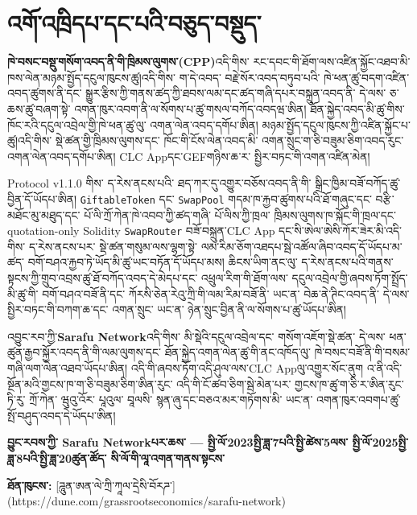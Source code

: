 \documentclass[11pt]{article}
\begin{document}
\section*{འགོ་འཁྲིདཔ་དང་པའི་བཅུད་བསྡུད་}

\textbf{ ཁེ་བསང་བསྡུ་གསོག་འབད་ནི་གི་ཁྲིམས་ལུགས་(CPP)}འདི་གིས་ རང་དབང་གི་ཐོག་ལས་འཛིན་སྐྱོང་འཐབ་མི་ ཁས་ལེན་མཉམ་སྤྱོད་དངུལ་ཁུངས་ཚུ།འདི་གིས་ ག་དེ་འབད་ བརྗེ་སོར་འབད་བཏུབ་པའི་ ཁེ་ཕན་ཚུ་བདག་འཛིན་འབད་ཚུགས་ནི་དང་ སྒྱུར་རྩིས་ཀྱི་གནས་ཚད་ཀྱི་ཐབས་ལམ་དང་ཚད་གཞི་དཔར་བསྐྲུན་འབད་ནི་ དེ་ལས་ ཅ་ཆས་ཚུ་བཞག་སྟེ་ འགན་ཁུར་འབག་ནི་ལ་སོགས་པ་ཚུ་གསལ་བཀོད་འབདཝ་ཨིན། ཐོན་སྐྱེད་འབད་མི་ཚུ་གིས་ ཁོང་རའི་དངུལ་འབྲེལ་གྱི་ཁེ་ཕན་ཚུ་ལུ་ འགན་ལེན་འབད་དགོཔ་ཨིན། མཉམ་སྤྱོད་དངུལ་ཁུངས་ཀྱི་འཛིན་སྐྱོང་པ་ཚུ།འདི་གིས་ སྡེ་ཚན་གྱི་ཁྲིམས་ལུགས་དང་ ཁོང་གི་ངོས་ལེན་འབད་མི་ འགན་སྲུང་ག་ཅི་བཟུམ་ཅིག་འབད་རུང་ འགན་ལེན་འབད་དགོཔ་ཨིན། CLC Appདང་GEFགཉིས་ཆ་ར་ སྤྱིར་བཏང་གི་འགན་འཛིན་མེན།

Protocol v1.1.0 གིས་ ད་རེས་ནངས་པའི་ ཐད་ཀར་དུ་འགྱུར་བཅོས་འབད་ནི་གི་ སྒྲིང་ཁྱིམ་བཟོ་བཀོད་ཚུ་བྱིན་དོ་ཡོདཔ་ཨིན། \texttt{GiftableToken} དང་ \texttt{SwapPool} གདམ་ཁ་རྐྱབ་ཚུགས་པའི་ཐོ་གཞུང་དང་ བརྩི་མཐོང་མུ་མཐུད་དང་ པོ་ལི་ཀྲོ་ཀེན་ཁེ་འབབ་ཀྱི་ཚད་གཞི་ པོ་ལིས་ཀྱི་ཁྲལ་ ཁྲིམས་ལུགས་ཁ་སྐོང་གི་ཁྲལ་དང་ quotation-only Solidity \texttt{SwapRouter} བཟོ་བསྐྲུན་CLC App དང་སི་ཨེལ་ཨེསི་ཀོར་ཟེར་མི་འདི་གིས་ ད་རེས་ནངས་པར་ སྡེ་ཚན་གསུམ་ལས་ལྷག་སྟེ་ ལམ་རིམ་ཅོག་འཐདཔ་སྦེ་འཚོལ་ཞིབ་འབད་དོ་ཡོདཔ་མ་ཚད་ བགོ་བཤའ་རྐྱབ་ཏེ་ཡོད་མི་ཚུ་ཡང་བཏོན་དོ་ཡོདཔ་མས། ཆིངས་ཡིག་ནང་ལུ་ ད་རེས་ནངས་པའི་གནས་སྟངས་ཀྱི་གྲུབ་འབྲས་ཚུ་ཐོ་བཀོད་འབད་དེ་མེདཔ་དང་ འཕྲུལ་རིག་གི་ཐོག་ལས་ དངུལ་འབྲེལ་གྱི་ཞབས་ཏོག་སྤྲོད་མི་ཚུ་གི་ བགོ་བཤའ་བཟོ་ནི་དང་ ཀོརསི་ཅེན་རེའུ་ཀྲི་གི་ལམ་རིམ་བཟོ་ནི་ ཡང་ན་ བེཆ་ནེ་ཊིང་འབད་ནི་ དེ་ལས་ སྤྱིར་བཏང་གི་བཀག་ཆ་དང་ འགན་སྲུང་ ཡང་ན་ ཉེན་སྲུང་བྱིན་ནི་ལ་སོགས་པ་ཚུ་ཡོདཔ་ཨིན།

འབྱུང་རབ་ཀྱི་\textbf{Sarafu Network}འདི་གིས་ མི་སྡེའི་དངུལ་འབྲེལ་དང་ གསོག་འཇོག་སྡེ་ཚན་ དེ་ལས་ ཕན་ཚུན་རྒྱབ་སྐྱོར་འབད་ནི་གི་ལམ་ལུགས་དང་ ཐོན་སྐྱེད་འགན་ལེན་ཚུ་གི་ནང་འཁོད་ལུ་ ཁེ་བསང་བཟོ་ནི་གི་བསམ་གཞི་ལག་ལེན་འཐབ་ཡོདཔ་ཨིན། འདི་གི་ཞབས་ཏོག་འདི་ཤུལ་ལས་CLC Appལུ་འགྱུར་སོང་ནུག འ་ནི་འདི་ སྔོན་མའི་གྱངས་ཁ་ག་ཅི་བཟུམ་ཅིག་ཨིན་རུང་ འདི་གི་ངོ་ཚབ་ཅིག་སྦེ་མེན་པར་ གྱངས་ཁ་ཚུ་ག་ཅི་ར་ཨིན་རུང་ ཏི་རུ་ ཀྲོ་ཀེན་ ཝུའུ་འོར་ པཱའུལ་ བཱལསི་ སྙན་ཞུ་དང་བཅའ་མར་གཏོགས་མི་ ཡང་ན་ འགན་ཁུར་འབགཔ་ཚུ་ སྤོ་བཤུད་འབད་དེ་ཡོདཔ་ཨིན།

\textbf{བྱུང་རབས་ཀྱི་ Sarafu Networkཔར་ཆས་ --- སྤྱི་ལོ་2023སྤྱི་ཟླ་7པའི་སྤྱི་ཚེས་5ལས་ སྤྱི་ལོ་2025སྤྱི་ཟླ་8པའི་སྤྱི་ཟླ་20ཚུན་ཚོད་ སི་ལོ་གི་ལཱ་འགན་གནས་སྟངས་}

\textbf{ཐོན་ཁུངས་: } [ཌཱུན་ཨན་ལེ་ཀྲི་ཀཱལ་དྲེསི་བོརཌ་] (https://dune.com/grassrootseconomics/sarafu-network)
\end{document}
